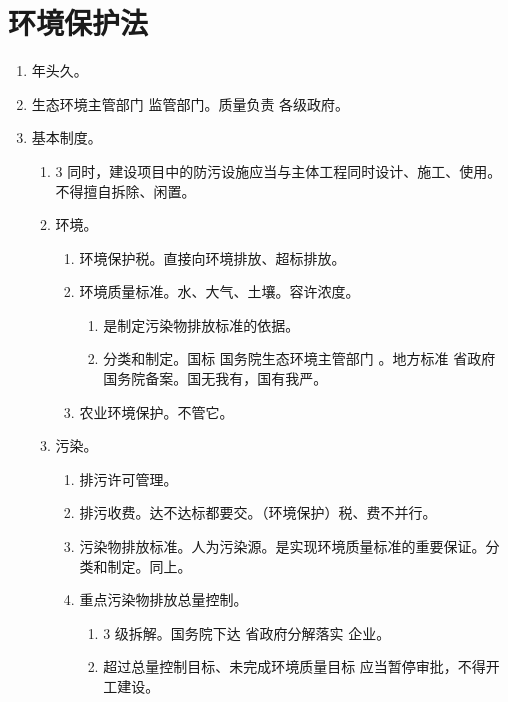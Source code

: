 \section{环境保护法}
\begin{enumerate}
  \item 年头久。
  \item 生态环境主管部门 \yjt 监管部门。质量负责 \yjt 各级政府。
  \item 基本制度。
        \begin{enumerate}
          \item 3 同时，建设项目中的防污设施应当与主体工程同时设计、施工、使用。不得擅自拆除、闲置。
          \item 环境。
                \begin{enumerate}
                  \item 环境保护税。直接向环境排放、超标排放。
                  \item 环境质量标准。水、大气、土壤。容许浓度。
                        \begin{enumerate}
                          \item 是制定污染物排放标准的依据。
                          \item 分类和制定。\yi 国标 \yjt 国务院生态环境主管部门 。\er 地方标准 \yjt 省政府 \yjt 国务院备案。国无我有，国有我严。
                        \end{enumerate}
                  \item 农业环境保护。不管它。
                \end{enumerate}
          \item 污染。
                \begin{enumerate}
                  \item 排污许可管理。
                  \item 排污收费。达不达标都要交。（环境保护）税、费不并行。
                  \item 污染物排放标准。人为污染源。\yi 是实现环境质量标准的重要保证。\er 分类和制定。同上。
                  \item 重点污染物排放总量控制。
                        \begin{enumerate}
                          \item 3 级拆解。国务院下达 \yjt 省政府分解落实 \yjt 企业。
                          \item 超过总量控制目标、未完成环境质量目标 \yjt 应当暂停审批，不得开工建设。
                        \end{enumerate}

\end{enumerate}
\end{enumerate}
\end{enumerate}

